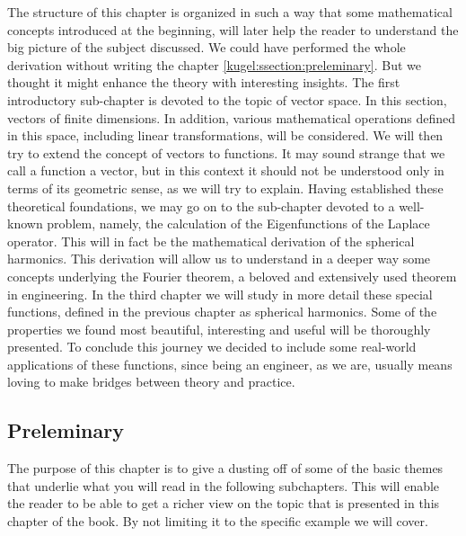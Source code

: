 The structure of this chapter is organized in such a way that some mathematical concepts introduced at the beginning, will later help the reader to understand the big picture of the subject discussed.\newline
We could have performed the whole derivation without writing the chapter \ref{kugel:ssection:preleminary}. But we thought it might enhance the theory with interesting insights.\newline
The first introductory sub-chapter is devoted to the topic of vector space.\newline
In this section, vectors of finite dimensions. In addition, various mathematical operations defined in this space, including linear transformations, will be considered.\newline
We will then try to extend the concept of vectors to functions. It may sound strange that we call a function a vector, but in this context it should not be understood only in terms of its geometric sense, as we will try to explain.\newline
Having established these theoretical foundations, we may go on to the sub-chapter devoted to a well-known problem, namely, the calculation of the Eigenfunctions of the Laplace operator. This will in fact be the mathematical derivation of the spherical harmonics.\newline
This derivation will allow us to understand in a deeper way some concepts underlying the Fourier theorem, a beloved and extensively used theorem in engineering.\newline
In the third chapter we will study in more detail these special functions, defined in the previous chapter as spherical harmonics.\newline
Some of the properties we found most beautiful, interesting and useful will be thoroughly presented.\newline
To conclude this journey we decided to include some real-world applications of these functions, since being an engineer, as we are, usually means loving to make bridges between theory and practice.

\subsection{Preleminary \label{kugel:ssection:preleminary}}
The purpose of this chapter is to give a dusting off of some of the basic themes that underlie what you will read in the following subchapters.\newline
This will enable the reader to be able to get a richer view on the topic that is presented in this chapter of the book. By not limiting it to the specific example we will cover.

